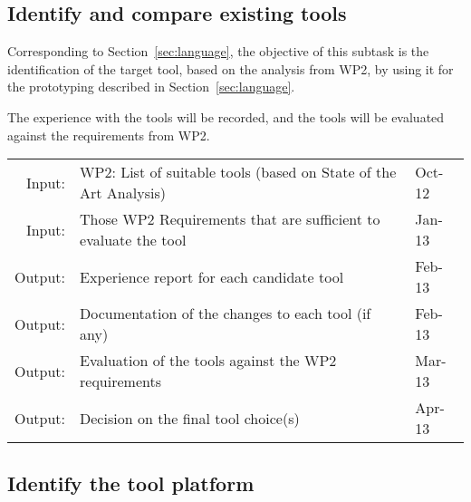 \documentclass[11pt, a4paper]{article}
\let\oldmarginpar\marginpar
\renewcommand\marginpar[1]{\-\oldmarginpar[\raggedleft\scriptsize #1]%
{\raggedright\scriptsize #1}}
\newenvironment{inoutput}
{\vspace{2mm}
\noindent
\begin{tabular}{|r|p{.7\linewidth}|l|}
\hline}
{
\hline
\end{tabular}}
\begin{document}
\subsection{Identify and compare existing tools}
\label{sec:tool}

Corresponding to Section~\ref{sec:language}, the objective of this subtask is the identification of the target tool, based on the analysis from WP2, by using it for the prototyping described in Section~\ref{sec:language}.

The experience with the tools will be recorded, and the tools will be evaluated against the requirements from WP2.


\begin{inoutput}
Input: & WP2: List of suitable tools (based on State of the Art Analysis) & Oct-12 \\
Input: & Those WP2 Requirements that are sufficient to evaluate the tool & Jan-13 \\
\hline
Output: & Experience report for each candidate tool & Feb-13 \\
Output: & Documentation of the changes to each tool (if any) & Feb-13 \\
Output: & Evaluation of the tools against the WP2 requirements & Mar-13 \\
Output: & Decision on the final tool choice(s) & Apr-13 \\
\end{inoutput}

\subsection{Identify the tool platform}
\label{sec:tool_platform}
\end{document}
